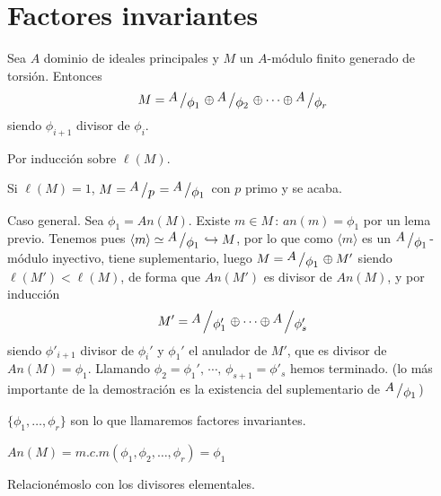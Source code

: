 \section{Factores invariantes}
\begin{teo}
    Sea $A$ dominio de ideales principales y $M$ un $A$-m\'odulo finito generado de torsi\'on. Entonces 
    $$M = \modulo{A}{\phi_1} \oplus \modulo{A}{\phi_2} \oplus \cdots \oplus \modulo{A}{\phi_r} $$
    siendo $\phi_{i+1}$ divisor de $\phi_{i}$. 
\end{teo}
\begin{dem}
    Por inducci\'on sobre $\ell(M)$. 

    Si $\ell(M)=1$, $M = \modulo{A}{p} = \modulo{A}{\phi_1}$ con $p$ primo y se acaba. 

    Caso general. Sea $\phi_1 = An(M)$. Existe $m \in M \, : \, an(m) = \phi_1$ por un lema previo. Tenemos pues $\langle m \rangle \simeq \modulo{A}{\phi_1} \hookrightarrow M$, por lo que como $\langle m \rangle$ es un $\modulo{A}{\phi_1}$-m\'odulo inyectivo, tiene suplementario, luego $M = \modulo{A}{\phi_1} \oplus M'$ siendo $\ell(M') < \ell(M)$, de forma que $An(M')$ es divisor de $An(M)$, y por inducci\'on
    $$M' = \modulo{A}{\phi'_1} \oplus  \cdots \oplus \modulo{A}{\phi_s'}$$
    siendo $\phi'_{i+1}$ divisor de $\phi_i'$ y $\phi_1'$ el anulador de $M'$, que es divisor de $An(M) = \phi_1$. Llamando $\phi_2 = \phi_1', \, \cdots, \, \phi_{s+1} = \phi'_s$ hemos terminado. (lo m\'as importante de la demostraci\'on es la existencia del suplementario de $\modulo{A}{\phi_1}$)
\end{dem}
\begin{defi}
    $\{\phi_1, \ldots, \phi_r\}$ son lo que llamaremos factores invariantes.
\end{defi}
\begin{obs}
    $An (M)= m.c.m(\phi_1, \phi_2, \ldots, \phi_r) = \phi_1$
\end{obs}

Relacion\'emoslo con los divisores elementales.

